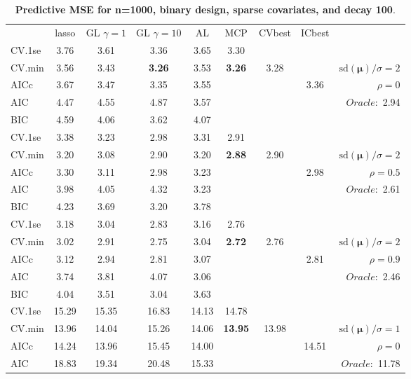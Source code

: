 \clearpage
\begin{table}\vspace{-.5cm}
\caption[l]{ { \bf Predictive MSE for n=1000, binary design, 
sparse covariates, and  decay  100}.}
\vspace{-.5cm}
\footnotesize{}
\begin{center}
\begin{tabular}{l*{7}{c}|r}
 & lasso & GL $\gamma=1$ & GL $\gamma=10$ & AL & MCP  & CVbest & ICbest  \\
\cline{1-9}
CV.1se & 3.76 & 3.61 & 3.36 & 3.65 & 3.30 & & & \\
CV.min & 3.56 & 3.43 & {\bf 3.26} & 3.53 & {\bf 3.26} & 3.28 & & $\mathrm{sd}(\mathbf{\mu})/\sigma=2$ \\
AICc & 3.67 & 3.47 & 3.35 & 3.55 & & & 3.36 &  $\rho=0$ \\
AIC & 4.47 & 4.55 & 4.87 & 3.57 & & & &  \multirow{2}{*}{$Oracle: $ 2.94} \\
BIC & 4.59 & 4.06 & 3.62 & 4.07 & & & &  \\
 \hline 
CV.1se & 3.38 & 3.23 & 2.98 & 3.31 & 2.91 & & & \\
CV.min & 3.20 & 3.08 & 2.90 & 3.20 & {\bf 2.88} & 2.90 & & $\mathrm{sd}(\mathbf{\mu})/\sigma=2$ \\
AICc & 3.30 & 3.11 & 2.98 & 3.23 & & & 2.98 &  $\rho=0.5$ \\
AIC & 3.98 & 4.05 & 4.32 & 3.23 & & & &  \multirow{2}{*}{$Oracle: $ 2.61} \\
BIC & 4.23 & 3.69 & 3.20 & 3.78 & & & &  \\
 \hline 
CV.1se & 3.18 & 3.04 & 2.83 & 3.16 & 2.76 & & & \\
CV.min & 3.02 & 2.91 & 2.75 & 3.04 & {\bf 2.72} & 2.76 & & $\mathrm{sd}(\mathbf{\mu})/\sigma=2$ \\
AICc & 3.12 & 2.94 & 2.81 & 3.07 & & & 2.81 &  $\rho=0.9$ \\
AIC & 3.74 & 3.81 & 4.07 & 3.06 & & & &  \multirow{2}{*}{$Oracle: $ 2.46} \\
BIC & 4.04 & 3.51 & 3.04 & 3.63 & & & &  \\
 \hline 
CV.1se & 15.29 & 15.35 & 16.83 & 14.13 & 14.78 & & & \\
CV.min & 13.96 & 14.04 & 15.26 & 14.06 & {\bf 13.95} & 13.98 & & $\mathrm{sd}(\mathbf{\mu})/\sigma=1$ \\
AICc & 14.24 & 13.96 & 15.45 & 14.00 & & & 14.51 &  $\rho=0$ \\
AIC & 18.83 & 19.34 & 20.48 & 15.33 & & & &  \multirow{2}{*}{$Oracle: $ 11.78} \\

\end{tabular}
\end{center}
\end{table}
